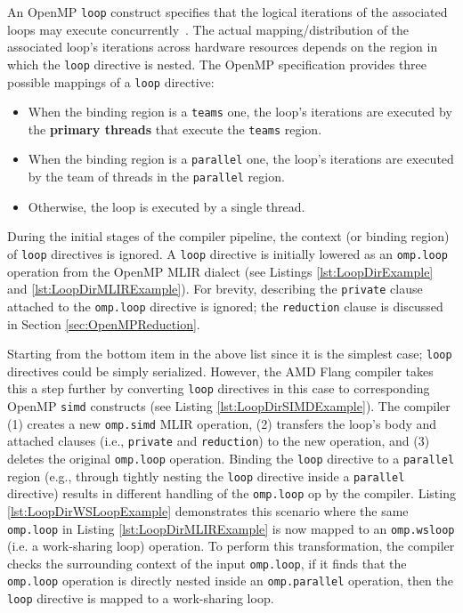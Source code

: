 \documentclass[acmtog,natbib=false]{acmart}
\newcommand{\code}[1]{\texttt{#1}\xspace}
\begin{document}
An OpenMP \code{loop} construct specifies that the logical iterations of the associated loops may execute concurrently~\cite{OARB21}.
The actual mapping/distribution of the associated loop's iterations across hardware resources depends on the region in which the \code{loop} directive is nested.
The OpenMP specification provides three possible mappings of a \code{loop} directive:
\begin{itemize}
    \item When the binding region is a \code{teams} one, the loop's iterations are executed by the \textbf{primary threads} that execute the \code{teams} region.
    \item When the binding region is a \code{parallel} one, the loop's iterations are executed by the team of threads in the \code{parallel} region.
    \item Otherwise, the loop is executed by a single thread.
\end{itemize}
During the initial stages of the compiler pipeline, the context (or binding region) of \code{loop} directives is ignored.
A \code{loop} directive is initially lowered as an \code{omp.loop} operation from the OpenMP \ac{MLIR} dialect (see Listings \ref{lst:LoopDirExample} and \ref{lst:LoopDirMLIRExample}).
For brevity, describing the \code{private} clause attached to the \code{omp.loop} directive is ignored; the \code{reduction} clause is discussed in Section \ref{sec:OpenMPReduction}.

Starting from the bottom item in the above list since it is the simplest case; \code{loop} directives could be simply serialized.
However, the AMD Flang compiler takes this a step further by converting \code{loop} directives in this case to corresponding OpenMP \code{simd} constructs (see Listing \ref{lst:LoopDirSIMDExample}).
The compiler (1) creates a new \code{omp.simd} \ac{MLIR} operation, (2) transfers the loop's body and attached clauses (i.e., \code{private} and \code{reduction}) to the new operation, and (3) deletes the original \code{omp.loop} operation.
Binding the \code{loop} directive to a \code{parallel} region (e.g., through tightly nesting the \code{loop} directive inside a \code{parallel} directive) results in different handling of the \code{omp.loop} op by the compiler.
Listing \ref{lst:LoopDirWSLoopExample} demonstrates this scenario where the same \code{omp.loop} in Listing \ref{lst:LoopDirMLIRExample} is now mapped to an \code{omp.wsloop} (i.e. a work-sharing loop) operation.
To perform this transformation, the compiler checks the surrounding context of the input \code{omp.loop}, if it finds that the \code{omp.loop} operation is directly nested inside an \code{omp.parallel} operation, then the \code{loop} directive is mapped to a work-sharing loop.
\end{document}
